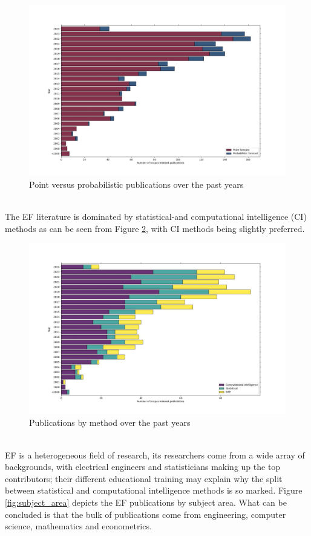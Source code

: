 \begin{figure}
  \includegraphics[width=\textwidth]{images/point_vs_prob.jpg}
  \caption{Point versus probabilistic publications over the past years}
  \label{fig:point_vs_prob}
\end{figure}
\\
The EF literature is dominated by statistical-and computational intelligence (CI) methods as can be seen from Figure \ref{fig:cs_stat_both}, with CI methods being slightly preferred. 
\begin{figure}
  \includegraphics[width=\textwidth]{images/cs_stat_both.jpg}
  \caption{Publications by method over the past years}
  \label{fig:cs_stat_both}
\end{figure}
\\
EF is a heterogeneous field of research, its researchers come from a wide array of backgrounds, with electrical engineers and statisticians making up the top contributors; their different educational training may explain why the split between statistical and computational intelligence methods is so marked. Figure \ref{fig:subject_area} depicts the EF publications by subject area. What can be concluded is that the bulk of publications come from engineering, computer science, mathematics and econometrics.
